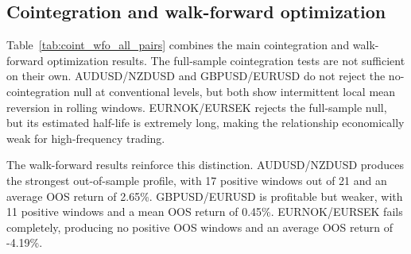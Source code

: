 \subsection{Cointegration and walk-forward optimization}

Table~\ref{tab:coint_wfo_all_pairs} combines the main cointegration and walk-forward optimization results. The full-sample cointegration tests are not sufficient on their own. AUDUSD/NZDUSD and GBPUSD/EURUSD do not reject the no-cointegration null at conventional levels, but both show intermittent local mean reversion in rolling windows. EURNOK/EURSEK rejects the full-sample null, but its estimated half-life is extremely long, making the relationship economically weak for high-frequency trading.

The walk-forward results reinforce this distinction. AUDUSD/NZDUSD produces the strongest out-of-sample profile, with 17 positive windows out of 21 and an average OOS return of 2.65\%. GBPUSD/EURUSD is profitable but weaker, with 11 positive windows and a mean OOS return of 0.45\%. EURNOK/EURSEK fails completely, producing no positive OOS windows and an average OOS return of -4.19\%.

